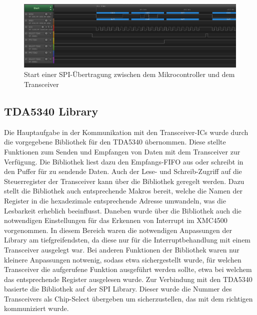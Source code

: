 \begin{figure}[h]
\centering
\includegraphics[width=\linewidth]{"Abbildungen/Aufnahmen/Bilder/Logic Analyser/SPI_Start"}
\caption{Start einer SPI-Übertragung zwischen dem Mikrocontroller und dem Transceiver}
\label{fig:spistart}
\end{figure}


\subsection{TDA5340 Library}
Die Hauptaufgabe in der Kommunikation mit den Transceiver-\acp{IC} wurde durch die vorgegebene Bibliothek für den TDA5340 übernommen. Diese stellte Funktionen zum Senden und Empfangen von Daten mit dem Transceiver zur Verfügung. Die Bibliothek liest dazu den Empfangs-\ac{FIFO} aus oder schreibt in den Puffer für zu sendende Daten. Auch der Lese- und Schreib-Zugriff auf die Steuerregister der Transceiver kann über die Bibliothek geregelt werden. Dazu stellt die Bibliothek auch entsprechende Makros bereit, welche die Namen der Register in die hexadezimale entsprechende Adresse umwandeln, was die Lesbarkeit erheblich beeinflusst. Daneben wurde über die Bibliothek auch die notwendigen  Einstellungen für das Erkennen von Interrupt im XMC4500 vorgenommen. In diesem Bereich waren die notwendigen Anpassungen der Library am tiefgreifendsten, da diese nur für die Interruptbehandlung mit einem Transceiver ausgelegt war. Bei anderen Funktionen der Bibliothek waren nur kleinere Anpassungen notwenig, sodass etwa sichergestellt wurde, für welchen Transceiver die aufgerufene Funktion ausgeführt werden sollte, etwa bei welchem das entsprechende Register ausgelesen wurde.
Zur Verbindung mit den TDA5340 basierte die Bibliothek auf der SPI Library. Dieser wurde die Nummer des Transceivers als Chip-Select übergeben um sicherzustellen, das mit dem richtigen kommuniziert wurde.


